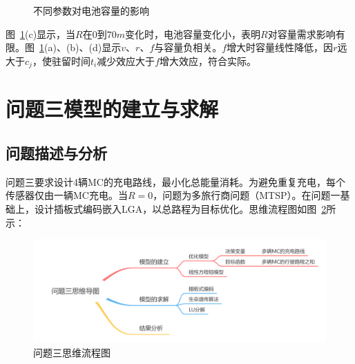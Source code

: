 \documentclass{whutmod}
\begin{document}
            \begin{figure}[H]
                \centering
            \end{figure}
            \begin{figure}[H]
                \centering
                \caption{不同参数对电池容量的影响}\label{mgh}
            \end{figure}

            图~\ref{mgh}(c)显示，当$R$在$0$到$70m$变化时，电池容量变化小，表明$R$对容量需求影响有限。图~\ref{mgh}(a)、(b)、(d)显示$v$、$r$、$f$与容量负相关。$f$增大时容量线性降低，因$r$远大于$c_j$，使驻留时间$t_i$减少效应大于$f$增大效应，符合实际。

    \section{问题三模型的建立与求解}
        \subsection{问题描述与分析}
            问题三要求设计4辆MC的充电路线，最小化总能量消耗。为避免重复充电，每个传感器仅由一辆MC充电。当$R=0$，问题为多旅行商问题（MTSP）。在问题一基础上，设计插板式编码嵌入LGA，以总路程为目标优化。思维流程图如图~\ref{asdf3}所示：

            \begin{figure}[H]
                \centering
                \includegraphics[width=\textwidth]{figures/3.png}
                \caption{问题三思维流程图}\label{asdf3}
            \end{figure}
\end{document}
